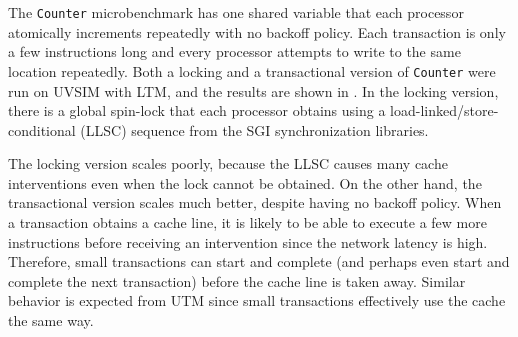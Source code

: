 The \texttt{Counter} microbenchmark has one shared variable that each
processor atomically increments repeatedly with no backoff
policy. Each transaction is only a few instructions long and every
processor attempts to write to the same location repeatedly.  Both a
locking and a transactional version of \texttt{Counter} were run on
UVSIM with LTM, and the results are shown in
. In the locking version, there is a global
spin-lock that each processor obtains using a
load-linked/store-conditional (LLSC) sequence from the SGI
synchronization libraries.

The locking version scales poorly, because the LLSC causes many cache
interventions even when the lock cannot be obtained. On the other
hand, the transactional version scales much better, despite having no
backoff policy.  When a transaction obtains a cache line, it is likely
to be able to execute a few more instructions before receiving an
intervention since the network latency is high.  Therefore, small
transactions can start and complete (and perhaps even start and
complete the next transaction) before the cache line is taken away.
Similar behavior is expected from UTM since small transactions
effectively use the cache the same way.

